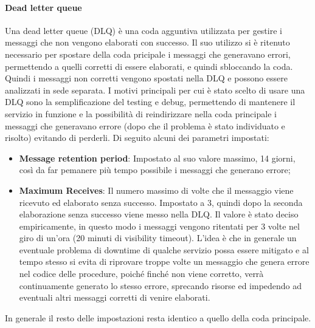 \paragraph{Dead letter queue}
Una dead letter queue (DLQ) è una coda agguntiva utilizzata per gestire i messaggi che non vengono elaborati con successo.
Il suo utilizzo si è ritenuto necessario per spostare della coda pricipale  i messaggi che generavano errori, permettendo a quelli corretti di essere elaborati, e quindi sbloccando la coda. Quindi i messaggi non corretti vengono spostati nella DLQ e possono essere analizzati in sede separata. I motivi principali per cui è stato scelto di usare una DLQ sono la semplificazione del testing e debug, permettendo di mantenere il servizio in funzione e la possibilità di reindirizzare nella coda principale i messaggi che generavano errore (dopo che il problema è stato individuato e risolto) evitando di perderli.
Di seguito alcuni dei parametri impostati:
\begin{itemize}
\item \textbf{Message retention period}: Impostato al suo valore massimo, 14 giorni, così da far pemanere più tempo possibile i messaggi che generano errore;
\item \textbf{Maximum Receives}:  Il numero massimo di volte che il messaggio viene ricevuto ed elaborato senza successo. Impostato a 3, quindi dopo la seconda elaborazione senza successo viene messo nella DLQ. Il valore è stato deciso empiricamente, in questo modo i messaggi vengono ritentati per 3 volte nel giro di un'ora (20 minuti di visibility timeout). L'idea è che in generale un eventuale problema di downtime di qualche servizio possa essere mitigato e al tempo stesso si evita di riprovare troppe volte un messaggio che genera errore nel codice delle procedure, poiché finché non viene corretto, verrà continuamente generato lo stesso errore, sprecando risorse ed impedendo ad eventuali altri messaggi corretti di venire elaborati. 
\end{itemize}
In generale il resto delle impostazioni resta identico a quello della coda principale.

